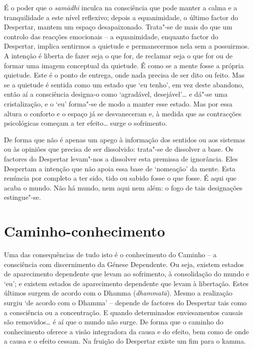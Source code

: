 É o poder que o \emph{samādhi} inculca na consciência que pode manter a calma e
a tranquilidade a este nível reflexivo; depois a equanimidade, o último factor
do Despertar, mantem um espaço desapaixonado. Trata"-se de mais do que um
controlo das reacções emocionais -- a equanimidade, enquanto factor do
Despertar, implica sentirmos a quietude e permanecermos nela sem a possuirmos. A
intenção é liberta de fazer seja o que for, de reclamar seja o que for ou de
formar uma imagem conceptual da quietude. É como se a mente fosse a própria
quietude. Este é o ponto de entrega, onde nada precisa de ser dito ou feito. Mas
se a quietude é sentida como um estado que `eu tenho', em vez deste abandono,
então aí a consciência designa-o como `agradável, desejável'\ldots{} e dá"-se
uma cristalização, e o `eu' forma"-se de modo a manter esse estado. Mas por essa
altura o conforto e o espaço já se desvaneceram e, à medida que as contracções
psicológicas começam a ter efeito\ldots{} surge o sofrimento.

De forma que não é apenas um apego à informação dos sentidos ou aos sistemas ou
às opiniões que precisa de ser dissolvido: trata"-se de dissolver a base. Os
factores do Despertar levam"-nos a dissolver esta premissa de ignorância. Eles
Despertam a intenção que não apoia essa base de `nomeação' da mente. Esta
renúncia por completo a ter sido, tido ou sabido fosse o que fosse. É aqui que
acaba o mundo. Não há mundo, nem aqui nem além: o fogo de tais designações
estingue"-se.

\section{Caminho-conhecimento}

Uma das consequências de tudo isto é o conhecimento do Caminho -- a consciência
com discernimento da Génese Dependente. Ou seja, existem estados de aparecimento
dependente que levam ao sofrimento, à consolidação do mundo e `eu'; e existem
estados de aparecimento dependente que levam à libertação. Estes últimos surgem
de acordo com o Dhamma (\emph{dhammatā}).
Mesmo a realização surgiu `de acordo com o Dhamma' -- depende de factores do
Despertar tais como a consciência ou a concentração. E quando determinados
enviesamentos causais são removidos\ldots{} é aí que o mundo não surge. De forma
que o caminho do conhecimento oferece a visão integradora da causa e do efeito,
bem como de onde a causa e o efeito cessam. Na fruição do Despertar existe um
fim para o kamma.

